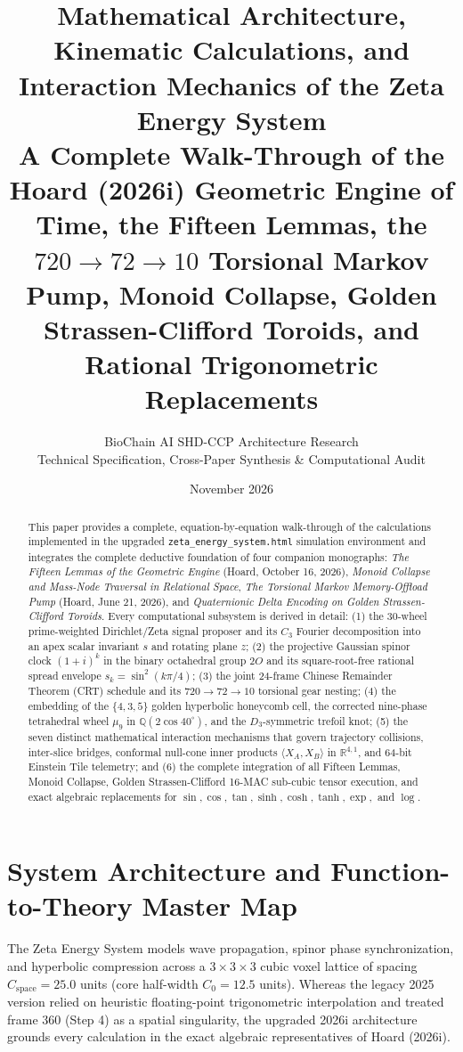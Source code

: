 \documentclass[11pt, a4paper]{article}
\title{\textbf{Mathematical Architecture, Kinematic Calculations, and Interaction Mechanics of the Zeta Energy System}\\[0.4em]
\large A Complete Walk-Through of the Hoard (2026i) Geometric Engine of Time, the Fifteen Lemmas, the $720 \to 72 \to 10$ Torsional Markov Pump, Monoid Collapse, Golden Strassen-Clifford Toroids, and Rational Trigonometric Replacements}
\author{BioChain AI SHD-CCP Architecture Research \\ \small Technical Specification, Cross-Paper Synthesis \& Computational Audit}
\date{November 2026}
\begin{document}
\maketitle

\begin{abstract}
This paper provides a complete, equation-by-equation walk-through of the calculations implemented in the upgraded \texttt{zeta\_energy\_system.html} simulation environment and integrates the complete deductive foundation of four companion monographs: \textit{The Fifteen Lemmas of the Geometric Engine} (Hoard, October 16, 2026), \textit{Monoid Collapse and Mass-Node Traversal in Relational Space}, \textit{The Torsional Markov Memory-Offload Pump} (Hoard, June 21, 2026), and \textit{Quaternionic Delta Encoding on Golden Strassen-Clifford Toroids}. Every computational subsystem is derived in detail: (1) the 30-wheel prime-weighted Dirichlet/Zeta signal proposer and its $C_3$ Fourier decomposition into an apex scalar invariant $s$ and rotating plane $z$; (2) the projective Gaussian spinor clock $(1+i)^k$ in the binary octahedral group $2O$ and its square-root-free rational spread envelope $s_k = \sin^2(k\pi/4)$; (3) the joint 24-frame Chinese Remainder Theorem (CRT) schedule and its $720 \to 72 \to 10$ torsional gear nesting; (4) the embedding of the $\{4,3,5\}$ golden hyperbolic honeycomb cell, the corrected nine-phase tetrahedral wheel $\mu_9$ in $\mathbb{Q}(2\cos 40^\circ)$, and the $D_3$-symmetric trefoil knot; (5) the seven distinct mathematical interaction mechanisms that govern trajectory collisions, inter-slice bridges, conformal null-cone inner products $\langle X_A, X_B\rangle$ in $\mathbb{R}^{4,1}$, and 64-bit Einstein Tile telemetry; and (6) the complete integration of all Fifteen Lemmas, Monoid Collapse, Golden Strassen-Clifford 16-MAC sub-cubic tensor execution, and exact algebraic replacements for $\sin, \cos, \tan, \sinh, \cosh, \tanh, \exp,$ and $\log$.
\end{abstract}

\tableofcontents
\newpage

\section{System Architecture and Function-to-Theory Master Map}

The Zeta Energy System models wave propagation, spinor phase synchronization, and hyperbolic compression across a $3\times 3\times 3$ cubic voxel lattice of spacing $C_{\text{space}} = 25.0$ units (core half-width $C_0 = 12.5$ units). Whereas the legacy 2025 version relied on heuristic floating-point trigonometric interpolation and treated frame $360$ (Step 4) as a spatial singularity, the upgraded 2026i architecture grounds every calculation in the exact algebraic representatives of Hoard (2026i).
\end{document}
